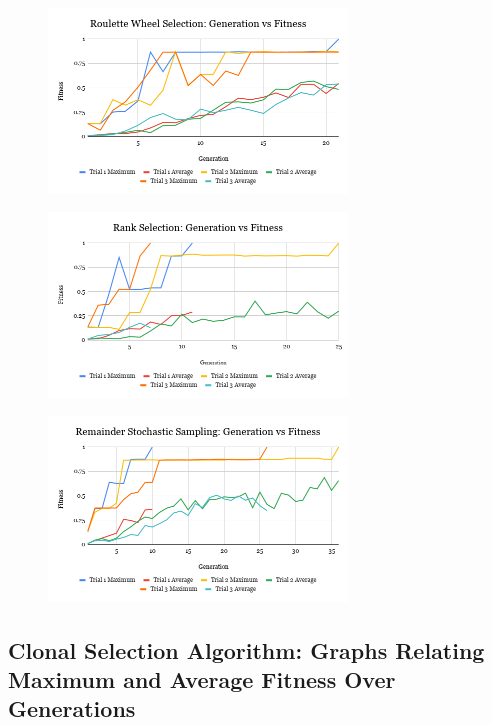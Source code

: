 \documentclass[]{interact}
\theoremstyle{plain} %
\theoremstyle{definition}
\theoremstyle{remark}
\begin{document}
\begin{figure}[H]
    \centering
    \includegraphics[width=300px]{img/Roulette Wheel Selection_ Generation vs Fitness.png}
    \label{fig:roulette-graph}
\end{figure}

\begin{figure}[H]
    \centering
    \includegraphics[width=300px]{img/Rank Selection_ Generation vs Fitness.png}
    \label{fig:rank-graph}
\end{figure}

\begin{figure}[H]
    \centering
    \includegraphics[width=300px]{img/Remainder Stochastic Sampling_ Generation vs Fitness.png}
    \label{fig:remainder-graph}
\end{figure}

\subsection{Clonal Selection Algorithm: Graphs Relating Maximum and Average Fitness Over Generations}
\end{document}

